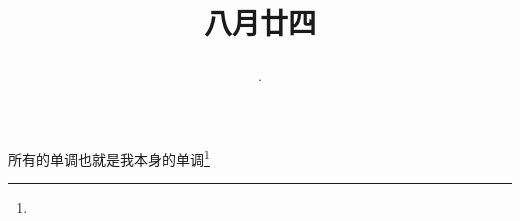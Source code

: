 \title{\date[d=26,m=9,y=2024][year:cn-y,年,month:cn,day:cn,日,·,weekday]·八月廿四 }
所有的单调也就是我本身的单调\footnote{ }

